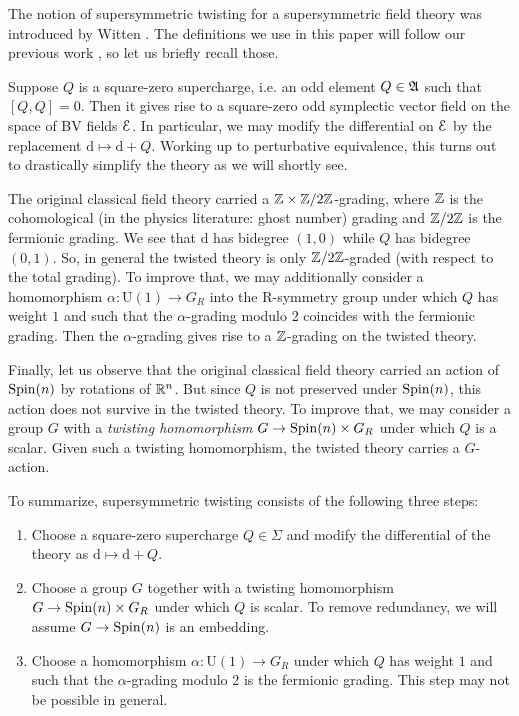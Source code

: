 \documentclass[10pt, oneside]{article}
\renewcommand{\U}{\mathrm{U}}
\begin{document}
The notion of supersymmetric twisting for a supersymmetric field theory was introduced by Witten \cite{WittenTQFT}. The definitions we use in this paper will follow our previous work \cite{ElliottSafronov}, so let us briefly recall those.

Suppose $Q$ is a square-zero supercharge, i.e. an odd element $Q\in\mathfrak A$ such that $[Q, Q]=0$. Then it gives rise to a square-zero odd symplectic vector field on the space of BV fields $\mathcal E$. In particular, we may modify the differential on $\mathcal E$ by the replacement $\mathrm{d}\mapsto \mathrm{d}+Q$. Working up to perturbative equivalence, this turns out to drastically simplify the theory as we will shortly see.

The original classical field theory carried a $\mathbb Z\times\mathbb Z/2\mathbb Z$-grading, where $\mathbb Z$ is the cohomological (in the physics literature: ghost number) grading and $\mathbb Z/2\mathbb Z$ is the fermionic grading. We see that $\mathrm{d}$ has bidegree $(1, 0)$ while $Q$ has bidegree $(0, 1)$. So, in general the twisted theory is only $\mathbb Z/2\mathbb Z$-graded (with respect to the total grading). To improve that, we may additionally consider a homomorphism $\alpha\colon \U(1)\rightarrow G_R$ into the R-symmetry group under which $Q$ has weight $1$ and such that the $\alpha$-grading modulo 2 coincides with the fermionic grading. Then the $\alpha$-grading gives rise to a $\mathbb Z$-grading on the twisted theory.

Finally, let us observe that the original classical field theory carried an action of $\mathrm{Spin}(n)$ by rotations of $\mathbb R^n$. But since $Q$ is not preserved under $\mathrm{Spin}(n)$, this action does not survive in the twisted theory. To improve that, we may consider a group $G$ with a \emph{twisting homomorphism} $G\rightarrow \mathrm{Spin}(n)\times G_R$ under which $Q$ is a scalar. Given such a twisting homomorphism, the twisted theory carries a $G$-action.

To summarize, supersymmetric twisting consists of the following three steps:


\begin{enumerate}
\item Choose a square-zero supercharge $Q\in\Sigma$ and modify the differential of the theory as $\mathrm{d}\mapsto\mathrm{d}+Q$.

\item Choose a group $G$ together with a twisting homomorphism $G\rightarrow \mathrm{Spin}(n)\times G_R$ under which $Q$ is scalar. To remove redundancy, we will assume $G\rightarrow \mathrm{Spin}(n)$ is an embedding.

\item Choose a homomorphism $\alpha\colon \U(1)\rightarrow G_R$ under which $Q$ has weight $1$ and such that the $\alpha$-grading modulo 2 is the fermionic grading. This step may not be possible in general.
\end{enumerate}
\end{document}
